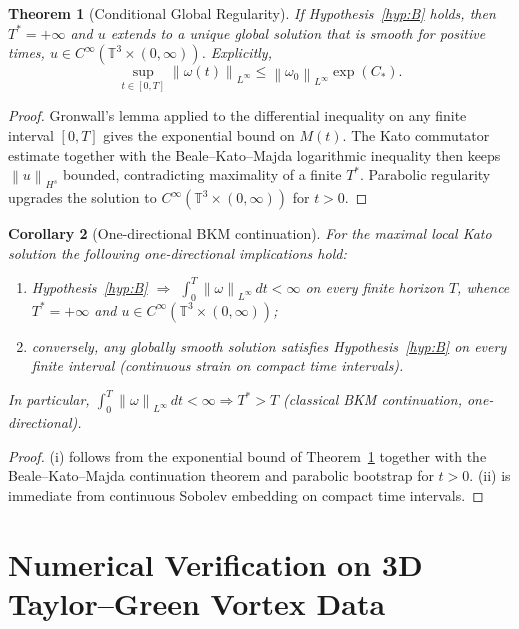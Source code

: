 \documentclass[11pt,reqno]{amsart}
\newtheorem{theorem}{Theorem}[section]
\newtheorem{corollary}[theorem]{Corollary}
\theoremstyle{definition}
\newcommand{\T}{\mathbb{T}^3}
\newcommand{\norm}[1]{\left\| #1 \right\|}
\begin{document}
\begin{theorem}[Conditional Global Regularity]\label{thm:main}
If Hypothesis~\ref{hyp:B} holds, then $T^*=+\infty$ and $u$ extends to a unique global solution that is smooth for positive times, $u\in C^\infty(\T\times(0,\infty))$. Explicitly,
\[
\sup_{t\in[0,T]} \norm{\omega(t)}_{L^\infty} \le \norm{\omega_0}_{L^\infty}\exp(C_*).
\]
\end{theorem}

\begin{proof}
Gronwall's lemma applied to the differential inequality on any finite interval $[0,T]$ gives the exponential bound on $M(t)$. The Kato commutator estimate together with the Beale--Kato--Majda logarithmic inequality then keeps $\norm{u}_{H^s}$ bounded, contradicting maximality of a finite $T^*$. Parabolic regularity upgrades the solution to $C^\infty(\T\times(0,\infty))$ for $t>0$.
\end{proof}

\begin{corollary}[One-directional BKM continuation]\label{cor:bkm_equiv}
For the maximal local Kato solution the following one-directional implications hold:
\begin{enumerate}
\item Hypothesis~\ref{hyp:B} $\Rightarrow$ $\int_0^{T}\norm{\omega}_{L^\infty}\,dt<\infty$ on every finite horizon $T$, whence $T^*=+\infty$ and $u\in C^\infty(\T\times(0,\infty))$;
\item conversely, any globally smooth solution satisfies Hypothesis~\ref{hyp:B} on every finite interval (continuous strain on compact time intervals).
\end{enumerate}
In particular, $\int_0^{T}\norm{\omega}_{L^\infty}\,dt<\infty\Rightarrow T^{*}>T$ (classical BKM continuation, one-directional).
\end{corollary}

\begin{proof}
(i) follows from the exponential bound of Theorem~\ref{thm:main} together with the Beale--Kato--Majda continuation theorem and parabolic bootstrap for $t>0$. (ii) is immediate from continuous Sobolev embedding on compact time intervals.
\end{proof}

\appendix

\section{Numerical Verification on 3D Taylor--Green Vortex Data}\label{app:numerical}
\end{document}
